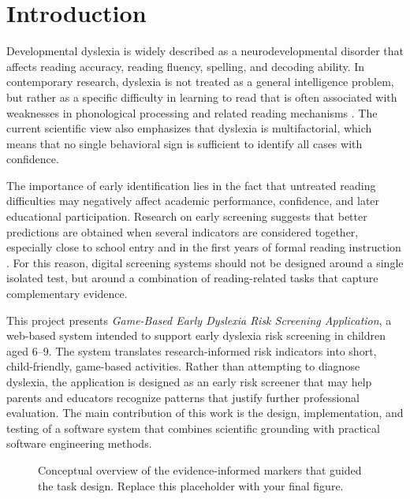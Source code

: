 \documentclass[conference]{IEEEtran}
\begin{document}
\section{Introduction}

Developmental dyslexia is widely described as a neurodevelopmental disorder that affects reading accuracy, reading fluency, spelling, and decoding ability. In contemporary research, dyslexia is not treated as a general intelligence problem, but rather as a specific difficulty in learning to read that is often associated with weaknesses in phonological processing and related reading mechanisms \cite{lyon2003,snowling2000,vellutino2004}. The current scientific view also emphasizes that dyslexia is multifactorial, which means that no single behavioral sign is sufficient to identify all cases with confidence.

The importance of early identification lies in the fact that untreated reading difficulties may negatively affect academic performance, confidence, and later educational participation. Research on early screening suggests that better predictions are obtained when several indicators are considered together, especially close to school entry and in the first years of formal reading instruction \cite{catts2015,puolakanaho2007}. For this reason, digital screening systems should not be designed around a single isolated test, but around a combination of reading-related tasks that capture complementary evidence.

This project presents \textit{Game-Based Early Dyslexia Risk Screening Application}, a web-based system intended to support early dyslexia risk screening in children aged 6--9. The system translates research-informed risk indicators into short, child-friendly, game-based activities. Rather than attempting to diagnose dyslexia, the application is designed as an early risk screener that may help parents and educators recognize patterns that justify further professional evaluation. The main contribution of this work is the design, implementation, and testing of a software system that combines scientific grounding with practical software engineering methods.

\begin{figure}[htbp]
\centering
{}
\caption{Conceptual overview of the evidence-informed markers that guided the task design. Replace this placeholder with your final figure.}
\label{fig:conceptual_overview}
\end{figure}
\end{document}
